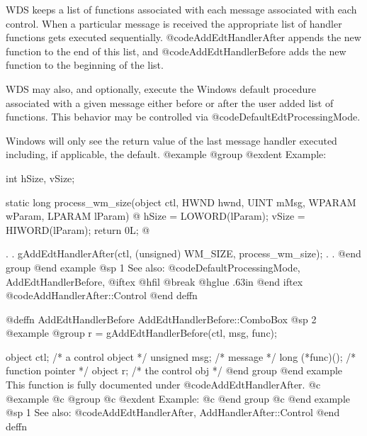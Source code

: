 {WDS keeps a list of functions associated with each message associated
with each control.  When a particular message is received the appropriate
list of handler functions gets executed sequentially.
@code{AddEdtHandlerAfter} appends the new function to the end of this list,
and @code{AddEdtHandlerBefore} adds the new function to the beginning of
the list.

WDS may also, and optionally, execute the Windows default procedure
associated with a given message either before or after the user added
list of functions.  This behavior may be controlled via
@code{DefaultEdtProcessingMode}.

Windows will only see the return value of the last message handler executed
including, if applicable, the default.
@example
@group
@exdent Example:

int     hSize, vSize;

static  long    process_wm_size(object  ctl, 
                                HWND    hwnd, 
                                UINT    mMsg, 
                                WPARAM  wParam, 
                                LPARAM  lParam)
@{
        hSize = LOWORD(lParam);
        vSize = HIWORD(lParam);
        return 0L;
@}

        .
        .
        gAddEdtHandlerAfter(ctl, (unsigned) WM_SIZE,
                                       process_wm_size);
        .
        .
@end group
@end example
@sp 1
See also:  @code{DefaultProcessingMode, AddEdtHandlerBefore,}
@iftex
@hfil @break @hglue .63in 
@end iftex
@code{AddHandlerAfter::Control}
@end deffn






@deffn {AddEdtHandlerBefore} AddEdtHandlerBefore::ComboBox
@sp 2
@example
@group
r = gAddEdtHandlerBefore(ctl, msg, func);

object   ctl;      /*  a control object  */
unsigned msg;      /*  message           */
long    (*func)(); /*  function pointer  */
object  r;         /*  the control obj   */
@end group
@end example
This function is fully documented under @code{AddEdtHandlerAfter}.
@c @example
@c @group
@c @exdent Example:
@c @end group
@c @end example
@sp 1
See also:  @code{AddEdtHandlerAfter, AddHandlerAfter::Control}
@end deffn













}
